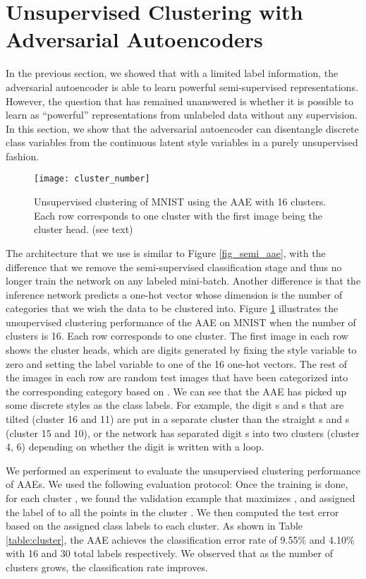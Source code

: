 \documentclass{article}
\begin{document}
\section{Unsupervised Clustering with Adversarial Autoencoders}
In the previous section, we showed that with a limited label information, the adversarial autoencoder is able to learn powerful semi-supervised representations. However, the question that has remained unanswered is whether it is possible to learn as ``powerful'' representations from unlabeled data without any supervision. In this section, we show that the adversarial autoencoder can disentangle discrete class variables from the continuous latent style variables in a purely unsupervised fashion. 

\begin{figure}[b]
\begin{center}
\centering 
\texttt{[image: cluster\_number]}
\caption{\label{fig:cluster}Unsupervised clustering of MNIST using the AAE with 16 clusters. Each row corresponds to one cluster with the first image being the cluster head. (see text)}
\end{center}
\end{figure}

The architecture that we use is similar to Figure \ref{fig_semi_aae}, with the difference that we remove the semi-supervised classification stage and thus no longer train the network on any labeled mini-batch. Another difference is that the inference network  predicts a one-hot vector whose dimension is the number of categories that we wish the data to be clustered into. Figure \ref{fig:cluster} illustrates the unsupervised clustering performance of the AAE on MNIST when the number of clusters is 16. Each row corresponds to one cluster. The first image in each row shows the cluster heads, which are digits generated by fixing the style variable to zero and setting the label variable to one of the 16 one-hot vectors. The rest of the images in each row are random test images that have been categorized into the corresponding category based on . We can see that the AAE has picked up some discrete styles as the class labels. For example, the digit s and s that are tilted (cluster 16 and 11) are put in a separate cluster than the straight s and s (cluster 15 and 10), or the network has separated digit s into two clusters (cluster 4, 6) depending on whether the digit is written with a loop. 

We performed an experiment to evaluate the unsupervised clustering performance of AAEs. We used the following evaluation protocol: Once the training is done, for each cluster , we found the validation example  that maximizes , and assigned the label of  to all the points in the cluster . We then computed the test error based on the assigned class labels to each cluster. As shown in Table \ref{table:cluster}, the AAE achieves the classification error rate of 9.55\% and 4.10\% with 16 and 30 total labels respectively. We observed that as the number of clusters grows, the classification rate improves. 
\end{document}
